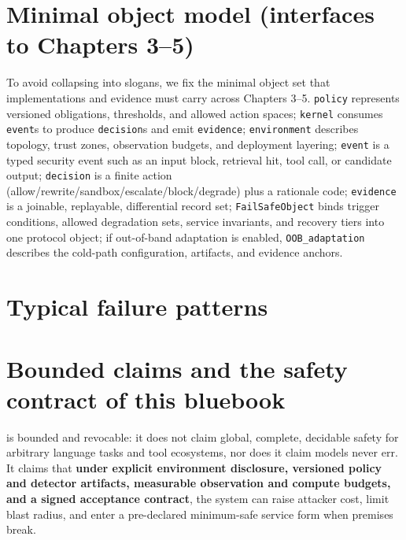 \documentclass[11pt,a4paper]{report}
\begin{document}
\section{Minimal object model (interfaces to Chapters 3--5)}
To avoid \DecoupledSafety{} collapsing into slogans, we fix the minimal object set that implementations and evidence must carry across Chapters 3--5. \texttt{policy} represents versioned obligations, thresholds, and allowed action spaces; \texttt{kernel} consumes \texttt{event}s to produce \texttt{decision}s and emit \texttt{evidence}; \texttt{environment} describes topology, trust zones, observation budgets, and deployment layering; \texttt{event} is a typed security event such as an input block, retrieval hit, tool call, or candidate output; \texttt{decision} is a finite action (allow/rewrite/sandbox/escalate/block/degrade) plus a rationale code; \texttt{evidence} is a joinable, replayable, differential record set; \texttt{FailSafeObject} binds trigger conditions, allowed degradation sets, service invariants, and recovery tiers into one protocol object; if out-of-band adaptation is enabled, \texttt{OOB\_adaptation} describes the cold-path configuration, artifacts, and evidence anchors.

\section{Typical failure patterns}

\section{Bounded claims and the safety contract of this bluebook}
\DecoupledSafety{} is bounded and revocable: it does not claim global, complete, decidable safety for arbitrary language tasks and tool ecosystems, nor does it claim models never err. It claims that \textbf{under explicit environment disclosure, versioned policy and detector artifacts, measurable observation and compute budgets, and a signed acceptance contract}, the system can raise attacker cost, limit blast radius, and enter a pre-declared minimum-safe service form when premises break.
\end{document}

